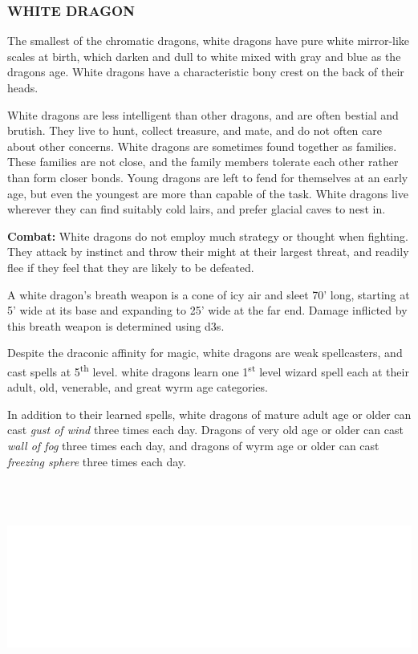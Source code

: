 \begin{multicols}{2}
\subsubsection{WHITE DRAGON}

The smallest of the chromatic dragons, white dragons have pure white mirror-like scales at birth, which darken and dull to white mixed with gray and blue as the dragons age. White dragons have a characteristic bony crest on the back of their heads.

White dragons are less intelligent than other dragons, and are often bestial and brutish. They live to hunt, collect treasure, and mate, and do not often care about other concerns. White dragons are sometimes found together as families. These families are not close, and the family members tolerate each other rather than form closer bonds. Young dragons are left to fend for themselves at an early age, but even the youngest are more than capable of the task. White dragons live wherever they can find suitably cold lairs, and prefer glacial caves to nest in. 

\textbf{Combat:} White dragons do not employ much strategy or thought when fighting. They attack by instinct and throw their might at their largest threat, and readily flee if they feel that they are likely to be defeated.

A white dragon's breath weapon is a cone of icy air and sleet 70' long, starting at 5' wide at its base and expanding to 25' wide at the far end. Damage inflicted by this breath weapon is determined using d3s.

Despite the draconic affinity for magic, white dragons are weak spellcasters, and cast spells at 5\textsuperscript{th} level. white dragons learn one 1\textsuperscript{st} level wizard spell each at their adult, old, venerable, and great wyrm age categories.

In addition to their learned spells, white dragons of mature adult age or older can cast \textit{gust of wind} three times each day. Dragons of very old age or older can cast \textit{wall of fog} three times each day, and dragons of wyrm age or older can cast \textit{freezing sphere} three times each day.

\end{multicols}

\noindent\includegraphics[width=\columnwidth, height=2.75in]{testblock.pdf}

